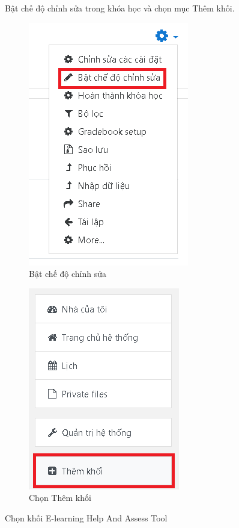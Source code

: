 \newpage
Bật chế độ chỉnh sửa trong khóa học và chọn mục Thêm khối.

\begin{center}
	\begin{figure}[htp]
		\begin{center}
			\includegraphics[width=0.4\linewidth]{img/36}
		\end{center}
		\caption{Bật chế độ chỉnh sửa}
		\label{refhinh44}
	\end{figure}
\end{center}

\begin{center}
	\begin{figure}[htp]
		\begin{center}
			\includegraphics[width=0.35\linewidth]{img/38}
		\end{center}
		\caption{Chọn Thêm khối}
		\label{refhinh46}
	\end{figure}
\end{center}

\newpage
Chọn khối E-learning Help And Assess Tool

